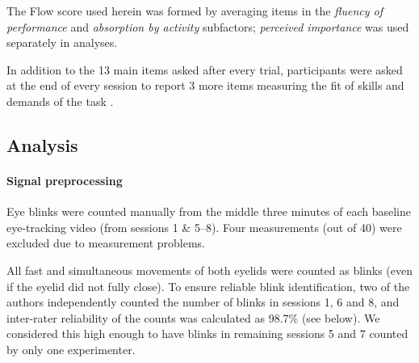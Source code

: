 \documentclass[10pt,letterpaper,floatsintext]{article}
\begin{document}
The Flow score used herein was formed by averaging items in the {\it fluency of performance} and {\it absorption by activity} subfactors; {\it perceived importance} was used separately in analyses.

In addition to the 13 main items asked after every trial, participants were asked at the end of every session to report 3 more items measuring the fit of skills and demands of the task \cite{Rheinberg2003}.

%
%

\subsection*{Analysis}

\paragraph{Signal preprocessing}
Eye blinks were counted manually from the middle three minutes of each baseline eye-tracking video (from sessions 1 \& 5--8). Four measurements (out of 40) were excluded due to measurement problems.

All fast and simultaneous movements of both eyelids were counted as blinks (even if the eyelid did not fully close). To ensure reliable blink identification, two of the authors independently counted the number of blinks in sessions 1, 6 and 8, and inter-rater reliability of the counts was calculated as 98.7\% (see below). We considered this high enough to have blinks in remaining sessions 5 and 7 counted by only one experimenter.
\end{document}

